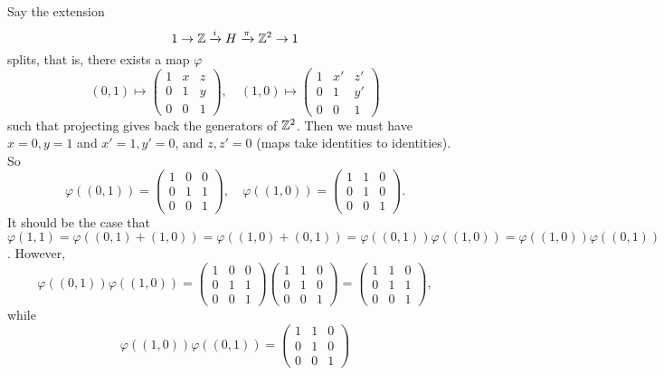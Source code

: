 \begin{ex}
    Say the extension \[
    1 \to  \mathbb{Z} \xrightarrow iH \xrightarrow{\pi} \mathbb{Z}^2\to 1
    \] splits, that is, there exists a map $\varphi $ \[
    (0,1) \mapsto \begin{pmatrix}
       1 & x & z \\
       0 & 1 & y \\
       0 & 0 & 1
   \end{pmatrix} , \quad (1,0)\mapsto 
   \begin{pmatrix}
       1 & x' & z' \\
       0 & 1 & y' \\
       0 & 0 & 1
   \end{pmatrix}
   \] such that projecting gives back the generators of  $\mathbb{Z}^2$. Then we must have $x=0,y=1$ and  $x'=1,y'=0$, and $z,z'=0$ (maps take identities to identities). So \[
    \varphi ((0,1))=
    \begin{pmatrix}
        1 & 0 & 0 \\ 0 & 1 & 1 \\ 0 & 0 & 1
    \end{pmatrix}, \quad \varphi ((1,0))=
    \begin{pmatrix}
        1 & 1 & 0 \\ 0 & 1 & 0 \\ 0 & 0 & 1
    \end{pmatrix}.
    \] It should be the case that $\varphi (1,1)=\varphi ((0,1)+(1,0))=\varphi ((1,0)+(0,1))=\varphi ((0,1))\varphi ((1,0)) = \varphi ((1,0))\varphi ((0,1))$. However, \[
    \varphi ((0,1))\varphi ((1,0))=
    \begin{pmatrix}
        1 & 0 & 0 \\ 0 & 1 & 1 \\ 0 & 0 & 1
    \end{pmatrix}
    \begin{pmatrix}
        1 & 1 & 0 \\ 0 & 1 & 0 \\ 0 & 0 & 1
    \end{pmatrix}=
    \begin{pmatrix}
        1 & 1 & 0 \\ 0 & 1 & 1 \\ 0 & 0 & 1
    \end{pmatrix},
    \] while \[
    \varphi ((1,0))\varphi ((0,1))= 
    \begin{pmatrix}
        1 & 1 & 0 \\ 0 & 1 & 0 \\ 0 & 0 & 1

\end{pmatrix}\]
\end{ex}
